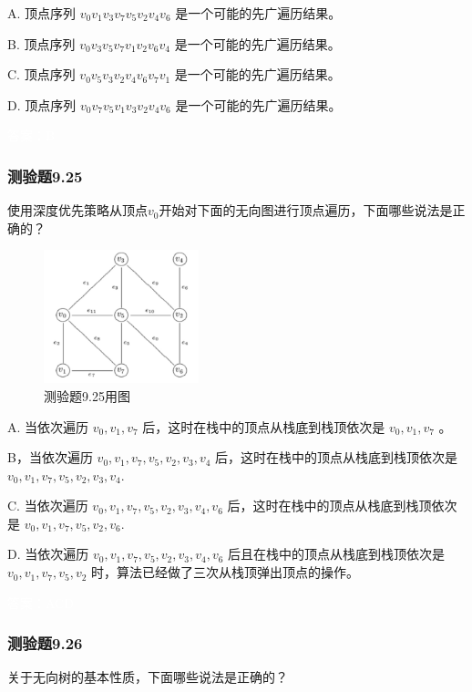 \documentclass[UTF8, heading=true]{ctexart}
\begin{document}
A. 顶点序列 $v_0 v_1 v_3 v_7 v_5 v_2 v_4 v_6$ 是一个可能的先广遍历结果。

B. 顶点序列 $v_0 v_3 v_5 v_7 v_1 v_2 v_6 v_4$ 是一个可能的先广遍历结果。

C. 顶点序列 $v_0 v_5 v_3 v_2 v_4 v_6 v_7 v_1$ 是一个可能的先广遍历结果。

D.  顶点序列 $v_0 v_7 v_5 v_1 v_3 v_2 v_4 v_6$ 是一个可能的先广遍历结果。

\textcolor{white}{答案：B}

\subsubsection{测验题9.25}

使用深度优先策略从顶点$v_0$开始对下面的无向图进行顶点遍历，下面哪些说法是正确的？

\begin{figure}[H]
  \centering
  \includegraphics[width=0.4\textwidth]{9.24.jpg} %
  \caption{测验题9.25用图}
\end{figure}

A. 当依次遍历 $v_0, v_1, v_7$ 后，这时在栈中的顶点从栈底到栈顶依次是 $v_0, v_1, v_7$ 。

B，当依次遍历 $v_0, v_1, v_7, v_5, v_2, v_3, v_4$ 后，这时在栈中的顶点从栈底到栈顶依次是 $v_0, v_1, v_7, v_5, v_2, v_3, v_4$.

C. 当依次遍历 $v_0, v_1, v_7, v_5, v_2, v_3, v_4, v_6$ 后，这时在栈中的顶点从栈底到栈顶依次是 $v_0, v_1, v_7, v_5, v_2, v_6$.

D. 当依次遍历 $v_0, v_1, v_7, v_5, v_2, v_3, v_4, v_6$ 后且在栈中的顶点从栈底到栈顶依次是 $v_0, v_1, v_7, v_5, v_2$ 时，算法已经做了三次从栈顶弹出顶点的操作。

\textcolor{white}{答案：ACD}

\subsubsection{测验题9.26}

关于无向树的基本性质，下面哪些说法是正确的？
\end{document}
